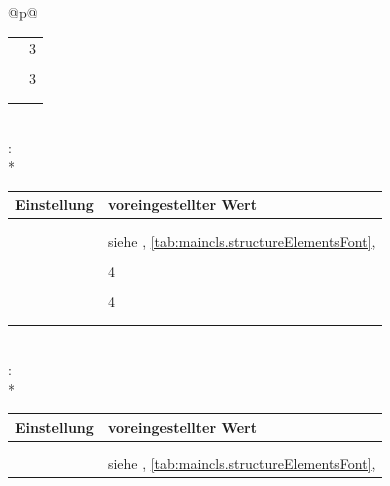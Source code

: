 \begin{longtable}{@{}p{\columnwidth}@{}}
\begin{tabularx}{\linewidth}{ll}
    \PValue{level}       & 3 \\
    \PValue{tocindent}   & \PValue{7.0em}\\
    \PValue{toclevel}    & 3 \\
    \PValue{tocnumwidth} & \PValue{4.1em}\\
    \PValue{tocstyle}    & \PValue{section} \\
    \bottomrule
    \end{tabularx} \\
    \addlinespace[\normalbaselineskip]
    : \\*
    \begin{tabularx}{\linewidth}{ll}
    \toprule
    Einstellung & voreingestellter Wert \\
    \midrule\nopagebreak
    \PValue{afterskip}   & \PValue{-1em} \\
    \PValue{beforeskip}  & \PValue{3.25ex plus 1ex minus .2ex} \\
    \PValue{font}        & siehe
                           \DescRef{maincls.fontelement.paragraph},
                           \autoref{tab:maincls.structureElementsFont},
                           \autopageref{tab:maincls.structureElementsFont} \\
    \PValue{indent}      & \PValue{0pt} \\
    \PValue{level}       & 4 \\
    \PValue{tocindent}   & \PValue{10em}\\
    \PValue{toclevel}    & 4 \\
    \PValue{tocnumwidth} & \PValue{5em}\\
    \PValue{tocstyle}    & \PValue{section} \\
    \bottomrule
    \end{tabularx} \\
    \addlinespace[\normalbaselineskip]
    :  \\*
    \begin{tabularx}{\linewidth}{ll}
    \toprule
    Einstellung & voreingestellter Wert \\
    \midrule\nopagebreak
    \PValue{afterskip}   & \PValue{-1em} \\
    \PValue{beforeskip}  & \PValue{3.25ex plus 1ex minus .2ex} \\
    \PValue{font}        & siehe
                           \DescRef{maincls.fontelement.subparagraph},
                           \autoref{tab:maincls.structureElementsFont},

\end{tabularx}
\end{longtable}

